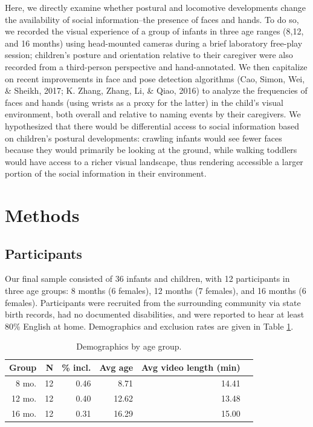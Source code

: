\documentclass[10pt, letterpaper]{article}
\begin{document}
Here, we directly examine whether postural and locomotive developments
change the availability of social information--the presence of faces and
hands. To do so, we recorded the visual experience of a group of infants
in three age ranges (8,12, and 16 months) using head-mounted cameras
during a brief laboratory free-play session; children's posture and
orientation relative to their caregiver were also recorded from a
third-person perspective and hand-annotated. We then capitalize on
recent improvements in face and pose detection algorithms (Cao, Simon,
Wei, \& Sheikh, 2017; K. Zhang, Zhang, Li, \& Qiao, 2016) to analyze the
frequencies of faces and hands (using wrists as a proxy for the latter)
in the child's visual environment, both overall and relative to naming
events by their caregivers. We hypothesized that there would be
differential access to social information based on children's postural
developments: crawling infants would see fewer faces because they would
primarily be looking at the ground, while walking toddlers would have
access to a richer visual landscape, thus rendering accessible a larger
portion of the social information in their environment.

\section{Methods}\label{methods}

\subsection{Participants}\label{participants}

Our final sample consisted of 36 infants and children, with 12
participants in three age groups: 8 months (6 females), 12 months (7
females), and 16 months (6 females). Participants were recruited from
the surrounding community via state birth records, had no documented
disabilities, and were reported to hear at least 80\% English at home.
Demographics and exclusion rates are given in Table \ref{tab:pop}.

\begin{table}[H]
\centering
\begin{tabular}{rrrrrr}
  \hline
 Group & N & \% incl. & Avg age & Avg video length (min) \\ 
  \hline
   8 mo. &   12 & 0.46 & 8.71 & 14.41 \\ 
   12 mo. &  12 & 0.40 & 12.62 & 13.48 \\ 
   16 mo. &  12 & 0.31 & 16.29 & 15.00\\ 
   \hline
\end{tabular}
\caption{\label{tab:pop} Demographics by age group.}
\end{table}
\end{document}
